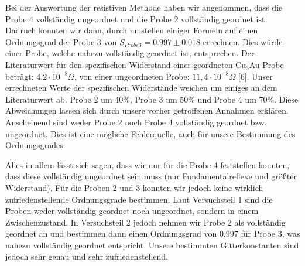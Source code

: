    Bei der Auswertung der resistiven Methode haben wir angenommen, dass die Probe 4 vollständig
    ungeordnet und die Probe 2 vollständig geordnet ist. Dadruch konnten wir dann, durch umstellen einiger Formeln
    auf einen Ordnungsgrad der Probe 3 von $S_{Probe 3} = 0.997 \pm 0.018$ errechnen. 
    Dies würde einer Probe, welche nahezu vollständig geordnet ist, entsprechen. 
    Der Literaturwert für den spezifischen Widerstand einer geordneten Cu$_3$Au Probe beträgt: $4.2 \cdot 10^{-8}\Omega$, von einer ungeordneten
    Probe: $11,4\cdot 10^{-8}\Omega$ [6].
    Unser errechneten Werte der spezifischen Widerstände weichen um einiges an dem Literaturwert ab.
    Probe 2 um 40\%, Probe 3 um 50\% und Probe 4 um 70\%. Diese Abweichungen lassen sich durch 
    unsere vorher getroffenen Annahmen erklären. Anscheinend sind weder Probe 2 noch Probe 4 vollständig geordnet bzw. ungeordnet.
    Dies ist eine mögliche Fehlerquelle, auch für unsere Bestimmung des Ordnungsgrades.
    
    Alles in allem lässt sich sagen, dass wir nur für die Probe 4 feststellen konnten, dass diese vollständig ungeordnet sein muss
    (nur Fundamentalreflexe und größter Widerstand). Für die Proben 2 und 3 konnten wir jedoch keine wirklich zufriedenstellende
    Ordnungsgrade bestimmen. Laut Versuchsteil 1 sind die Proben weder vollständig geordnet noch ungeordnet, sondern in einem
    Zwischenzustand. In Versuchsteil 2 jedoch nehmen wir Probe 2 als vollständig geordnet an und bestimmen
    dann einen Ordnungsgrad von $0.997$ für Probe 3, was nahezu vollständig geordnet entspricht. 
    Unsere bestimmten Gitterkonstanten sind jedoch sehr genau und sehr zufriedenstellend.